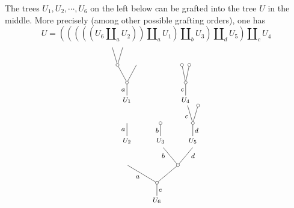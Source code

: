 \documentclass[a4paper,10pt]{article}%
\begin{document}
\begin{example} The trees $U_1, U_2,\cdots, U_6$ on the left below can be grafted into the tree $U$ in the middle.
More precisely (among other possible grafting orders), one has
\begin{equation}\label{UFORMULA EQ}
U = \left(
		\left(
			\left(
				\left(
					\left(U_6 \amalg_a U_2 \right)
				\right) \amalg_a U_1
			\right) \amalg_b U_3
		\right) \amalg_d U_5
	\right) \amalg_c U_4
\end{equation}
\begin{equation}\label{SUBSDATUMTREES EQ}
	\begin{tikzpicture}[grow=up,auto,level distance=2.1em,
	every node/.style = {font=\footnotesize,inner sep=2pt},
	dummy/.style={circle,draw,inner sep=0pt,minimum size=1.25mm}]
\begin{scope}[xshift=-2em]
	\begin{scope}
	\tikzstyle{level 2}=[sibling distance=2.25em]%
	\tikzstyle{level 3}=[sibling distance=1.25em]%
		\node at (-0.25,3.2) {$U_1$}
			child{node [dummy] {}
				child
				child{node [dummy] {}
					child
					child
				}
			edge from parent node {$a$}};
	\end{scope}
		\node at (-0.25,1.5) {$U_2$}
			child{
		edge from parent node {$a$}};
		\node at (1.15,1.5) {$U_3$}
			child{node [dummy] {}
		edge from parent node {$b$}};
	\begin{scope}
	\tikzstyle{level 2}=[sibling distance=0.875em]%
		\node at (2.2,3.2) {$U_4$}
			child{node [dummy] {}
				child{node [dummy] {}}
				child{node [dummy] {}}
			edge from parent node {$c$}};
	\end{scope}
	\begin{scope}
		\tikzstyle{level 2}=[sibling distance=1.25em]%
		\node at (2.5,1.5) {$U_5$}
			child{node [dummy] {}
				child{node[dummy] {}}
				child{
				edge from parent node {$c$}}
			edge from parent node [swap] {$d$}};
	\end{scope}
	\begin{scope}
	\tikzstyle{level 2}=[sibling distance=3.5em]%
	\tikzstyle{level 3}=[sibling distance=2.25em]%
		\node at (1,-1) {$U_6$}
			child{node [dummy] {}
				child[sibling distance = 5em]{node [dummy] {}
					child[sibling distance = 3.5em]{edge from parent node [swap,near end] {$d$} }
					child[sibling distance = 3.5em]{edge from parent node [near end] {$b$} }
				}
				child[sibling distance = 7em]{ edge from parent node {$a$} }
			edge from parent node [swap] {$e$}};
	\end{scope}
\end{scope}

\end{tikzpicture}
\end{equation}
\end{example}
\end{document}
